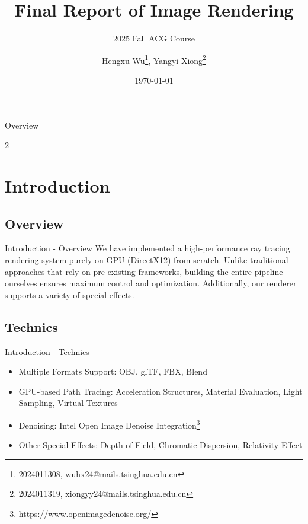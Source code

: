 \documentclass[aspectratio=169,xcolor=dvipsnames]{beamer}
\title{Final Report of Image Rendering}
\subtitle{2025 Fall ACG Course}
\author{\texorpdfstring{Hengxu Wu\footnote{2024011308, wuhx24@mails.tsinghua.edu.cn}, Yangyi Xiong\footnote{2024011319, xiongyy24@mails.tsinghua.edu.cn}}{Hengxu Wu, Yangyi Xiong}} %
\institute
{
    Institute for Interdisciplinary Information Sciences \\
    Tsinghua University %
}
\date{\today} %
\begin{document}
\begin{frame}
    \titlepage
\end{frame}

\begin{frame}{Overview}
    \begin{multicols}{2}
        \tableofcontents
    \end{multicols}
\end{frame}

\section{Introduction}
\subsection{Overview}

\begin{frame}{Introduction - Overview}
    We have implemented a high-performance ray tracing rendering system purely on GPU (DirectX12) from scratch. Unlike traditional approaches that rely on pre-existing frameworks, building the entire pipeline ourselves ensures maximum control and optimization. Additionally, our renderer supports a variety of special effects.
\end{frame}

\subsection{Technics}

\begin{frame}{Introduction - Technics}
    \begin{itemize}
        \item Multiple Formats Support: OBJ, glTF, FBX, Blend
        \item GPU-based Path Tracing: Acceleration Structures, Material Evaluation, Light Sampling, Virtual Textures
        \item Denoising: Intel Open Image Denoise Integration\footnote{https://www.openimagedenoise.org/}
        \item Other Special Effects: Depth of Field, Chromatic Dispersion, Relativity Effect
    \end{itemize}
\end{frame}
\end{document}
